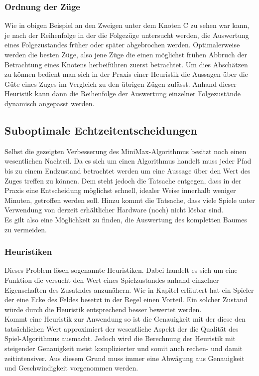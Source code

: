 \subsubsection{Ordnung der Züge}
Wie in obigen Beispiel an den Zweigen unter dem Knoten C zu sehen war kann, je nach der Reihenfolge in der die Folgezüge untersucht werden, die Auswertung eines Folgezustandes früher oder später abgebrochen werden. Optimalerweise werden die besten Züge, also jene Züge die einen möglichst frühen Abbruch der Betrachtung eines Knotens herbeiführen zuerst betrachtet. Um dies Abschätzen zu können bedient man sich in der Praxis einer Heuristik die Aussagen über die Güte eines Zuges im Vergleich zu den übrigen Zügen zulässt. Anhand dieser Heuristik kann dann die Reihenfolge der Auswertung einzelner Folgezustände dynamisch angepasst werden.

\subsection{Suboptimale Echtzeitentscheidungen}
Selbst die gezeigten Verbesserung des MiniMax-Algorithmus besitzt noch einen wesentlichen Nachteil. Da es sich um einen  Algorithmus handelt muss jeder Pfad bis zu einem Endzustand betrachtet werden um eine Aussage über den Wert des Zuges treffen zu können. Dem steht jedoch die Tatsache entgegen, dass in der Praxis eine Entscheidung möglichst schnell, idealer Weise innerhalb weniger Minuten, getroffen werden soll. Hinzu kommt die Tatsache, dass viele Spiele unter Verwendung von derzeit erhältlicher Hardware (noch) nicht lösbar sind.\\
Es gilt also eine Möglichkeit zu finden, die Auswertung des kompletten Baumes zu vermeiden.

\subsubsection{Heuristiken}
Dieses Problem lösen sogenannte Heuristiken. Dabei handelt es sich um eine Funktion die versucht den Wert eines Spielzustandes anhand einzelner Eigenschaften des Zusatndes anzunähern. Wie in Kapitel  erläutert hat ein Spieler der eine Ecke des Feldes besetzt in der Regel einen Vorteil. Ein solcher Zustand würde durch die Heuristik entsprechend besser bewertet werden.\\
Kommt eine Heuristik zur Anwendung so ist die Genauigkeit mit der diese den tatsächlichen Wert approximiert der wesentliche Aspekt der die Qualität des Spiel-Algorithmus ausmacht. Jedoch wird die Berechnung der Heuristik mit steigender Genauigkeit meist komplizierter und somit auch rechen- und damit zeitintensiver. Aus diesem Grund muss immer eine Abwägung aus Genauigkeit und Geschwindigkeit vorgenommen werden. 

